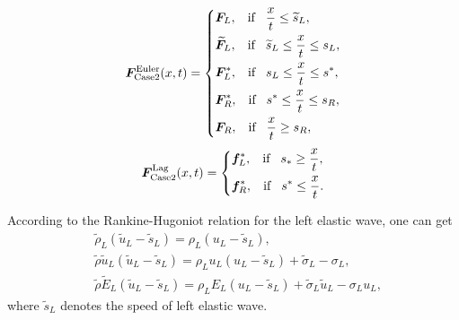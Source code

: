 \documentclass{article}
\numberwithin{equation}{section}
\numberwithin{table}{section}
\begin{document}
 \begin{equation}\label{eq:HLLCEP}
   \bm{F}^{\text{Euler}}_{\text{Case2}}(x,t) = \left\{ \begin{aligned}
	   & \bm{F}_L, \hspace{0.3cm} \text{if} \hspace{0.3cm} \frac{x}{t}\le \widetilde{s}_L, \\
		&  \widetilde{\bm{F}}_L, \hspace{0.3cm} \text{if} \hspace{0.3cm} \widetilde{s}_L\le \frac{x}{t} \le   s_L , \\
		&\bm{F}_L^*, \hspace{0.3cm} \text{if} \hspace{0.3cm} s_L\le \frac{x}{t} \le s^*, \\
		& \bm{F}_R^*, \hspace{0.3cm} \text{if} \hspace{0.3cm} s^*\le \frac{x}{t} \le s_R,\\
		& \bm{F}_R, \hspace{0.3cm} \text{if} \hspace{0.3cm} \frac{x}{t}\ge s_R, \\
	  \end{aligned}
	\right.
  \end{equation}
\begin{equation}
	\bm{F}^{\text{Lag}}_{\text{Case2}}(x,t) = \left\{ \begin{aligned}
		& \bm{f}_L^*, \hspace{0.3cm} \text{if} \hspace{0.3cm} s_*\ge \frac{x}{t},\\
		& \bm{f}_R^*, \hspace{0.3cm} \text{if} \hspace{0.3cm} s^*\le \frac{x}{t}.\\
	  \end{aligned}
	\right.
  \end{equation}

 According to the Rankine-Hugoniot relation for the left  elastic wave, one can  get
  \begin{align}
	&\widetilde{\rho}_L(\widetilde{u}_L-\widetilde{s}_L) = \rho_L(u_L-\widetilde{s}_L), \label{eq:RHp1}\\
	&\widetilde{\rho}\widetilde{u}_L(\widetilde{u}_L-\widetilde{s}_L) = \rho_Lu_L(u_L-\widetilde{s}_L)+\widetilde{\sigma}_L-\sigma_L,  \label{eq:RHp2}\\
	&\widetilde{\rho}\widetilde{E}_L(\widetilde{u}_L-\widetilde{s}_L) = \rho_LE_L(u_L-\widetilde{s}_L)+\widetilde{\sigma}_L \widetilde{u}_L-\sigma_Lu_L, \label{eq:RHp3}
\end{align}
where $\widetilde{s}_L$ denotes the speed of left elastic wave.
\end{document}
